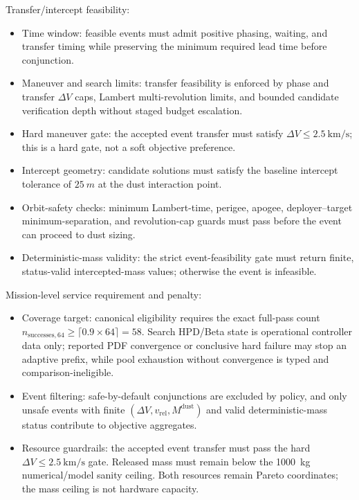     Transfer/intercept feasibility:
    \begin{itemize}[leftmargin=*]
        \item Time window: feasible events must admit positive phasing, waiting, and transfer timing while preserving the minimum required lead time before conjunction.
        \item Maneuver and search limits: transfer feasibility is enforced by phase and transfer \(\Delta V\) caps, Lambert multi-revolution limits, and bounded candidate verification depth without staged budget escalation.
        \item Hard maneuver gate: the accepted event transfer must satisfy \(\Delta V\leq\SI{2.5}{\kilo\metre\per\second}\); this is a hard gate, not a soft objective preference.
        \item Intercept geometry: candidate solutions must satisfy the baseline intercept tolerance of \(\SI{25}{m}\) at the dust interaction point.
        \item Orbit-safety checks: minimum Lambert-time, perigee, apogee, deployer--target minimum-separation, and revolution-cap guards must pass before the event can proceed to dust sizing.
        \item Deterministic-mass validity: the strict event-feasibility gate must return finite, status-valid intercepted-mass values; otherwise the event is infeasible.
    \end{itemize}

    Mission-level service requirement and penalty:
    \begin{itemize}[leftmargin=*]
        \item Coverage target: canonical eligibility requires the exact full-pass count \(n_{\mathrm{successes},64}\ge\lceil0.9\times64\rceil=58\). Search HPD/Beta state is operational controller data only; reported PDF convergence or conclusive hard failure may stop an adaptive prefix, while pool exhaustion without convergence is typed and comparison-ineligible.
        \item Event filtering: safe-by-default conjunctions are excluded by policy, and only unsafe events with finite \((\Delta V, v_{\mathrm{rel}}, M^{\mathrm{dust}})\) and valid deterministic-mass status contribute to objective aggregates.
        \item Resource guardrails: the accepted event transfer must pass the hard \(\Delta V\leq\SI{2.5}{\kilo\metre\per\second}\) gate. Released mass must remain below the \SI{1000}{\kilogram} numerical/model sanity ceiling. Both resources remain Pareto coordinates; the mass ceiling is not hardware capacity.
    \end{itemize}

